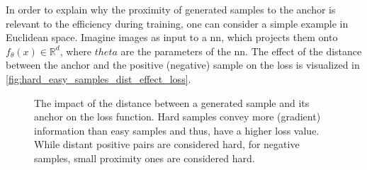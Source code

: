In order to explain why the proximity of generated samples to the anchor is relevant to the efficiency during training, 
one can consider a simple example in Euclidean space.
Imagine images as input to a \ac{nn}, which projects them onto $f_{\theta}(x) \in \mathbb{R}^d$, where $theta$ are the parameters of the \ac{nn}.
The effect of the distance between the anchor and the positive (negative) sample on the loss is visualized in \autoref{fig:hard_easy_samples_dist_effect_loss}.


\begin{figure}[htbp]
    \centering
    
    \caption{The impact of the distance between a generated sample and its anchor on the loss function.
    Hard samples convey more (gradient) information than easy samples and thus, have a higher loss value.
    While distant positive pairs are considered hard, for negative samples, small proximity ones are considered hard.}
    \label{fig:hard_easy_samples_dist_effect_loss}
\end{figure}